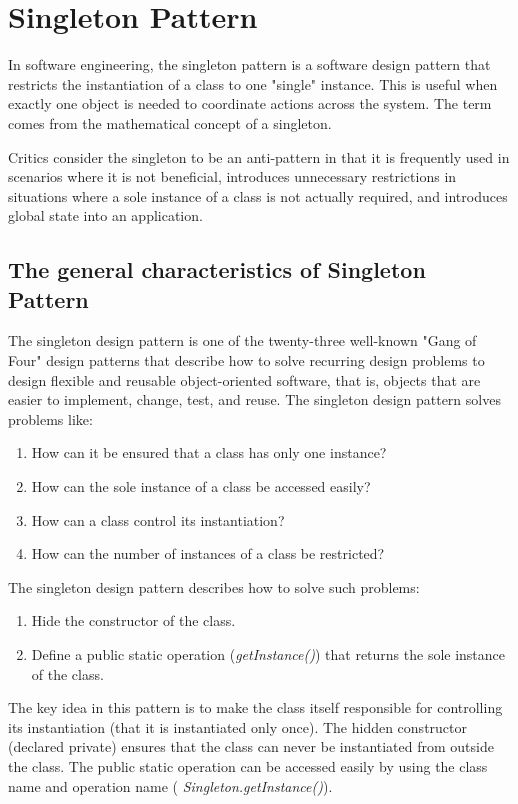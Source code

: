 \documentclass[a4paper]{report}
\begin{document}
\section{Singleton Pattern}
In software engineering, the singleton pattern is a software design pattern that restricts the instantiation of a class to one "single" instance. This is useful when exactly one object is needed to coordinate actions across the system. The term comes from the mathematical concept of a singleton. 
\par
Critics consider the singleton to be an anti-pattern in that it is frequently used in scenarios where it is not beneficial, introduces unnecessary restrictions in situations where a sole instance of a class is not actually required, and introduces global state into an application.

\subsection{The general characteristics of Singleton Pattern}

The singleton design pattern is one of the twenty-three well-known "Gang of Four" design patterns that describe how to solve recurring design problems to design flexible and reusable object-oriented software, that is, objects that are easier to implement, change, test, and reuse. 
The singleton design pattern solves problems like:
\begin{enumerate}
\item How can it be ensured that a class has only one instance?
\item How can the sole instance of a class be accessed easily?
\item How can a class control its instantiation?
\item How can the number of instances of a class be restricted?
\end{enumerate}

The singleton design pattern describes how to solve such problems: 
\begin{enumerate}
\item Hide the constructor of the class.
\item Define a public static operation (\emph{getInstance()}) that returns the sole instance of the class.
\end{enumerate}
The key idea in this pattern is to make the class itself responsible for controlling its instantiation (that it is instantiated only once).
The hidden constructor (declared private) ensures that the class can never be instantiated from outside the class.
The public static operation can be accessed easily by using the class name and operation name ( \emph{Singleton.getInstance()}). 
\end{document}
